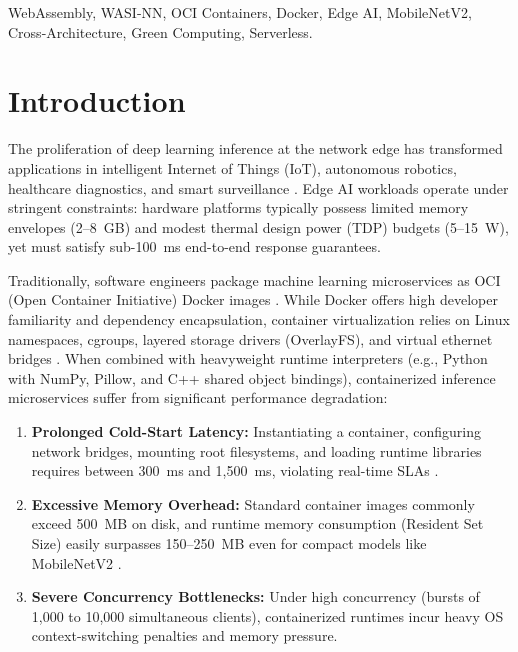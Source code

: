 \documentclass[conference]{IEEEtran}
\begin{document}
\begin{IEEEkeywords}
WebAssembly, WASI-NN, OCI Containers, Docker, Edge AI, MobileNetV2, Cross-Architecture, Green Computing, Serverless.
\end{IEEEkeywords}

\section{Introduction}
The proliferation of deep learning inference at the network edge has transformed applications in intelligent Internet of Things (IoT), autonomous robotics, healthcare diagnostics, and smart surveillance \cite{morabito2017evaluating}. Edge AI workloads operate under stringent constraints: hardware platforms typically possess limited memory envelopes (2--8~GB) and modest thermal design power (TDP) budgets (5--15~W), yet must satisfy sub-100~ms end-to-end response guarantees.

Traditionally, software engineers package machine learning microservices as OCI (Open Container Initiative) Docker images \cite{casalicchio2020container}. While Docker offers high developer familiarity and dependency encapsulation, container virtualization relies on Linux namespaces, cgroups, layered storage drivers (OverlayFS), and virtual ethernet bridges \cite{felter2015updated, sharma2016containers}. When combined with heavyweight runtime interpreters (e.g., Python with NumPy, Pillow, and C++ shared object bindings), containerized inference microservices suffer from significant performance degradation:
\begin{enumerate}
    \item \textbf{Prolonged Cold-Start Latency:} Instantiating a container, configuring network bridges, mounting root filesystems, and loading runtime libraries requires between 300~ms and 1,500~ms, violating real-time SLAs \cite{xuan2022measuring, wang2021cold}.
    \item \textbf{Excessive Memory Overhead:} Standard container images commonly exceed 500~MB on disk, and runtime memory consumption (Resident Set Size) easily surpasses 150--250~MB even for compact models like MobileNetV2 \cite{sandler2018mobilenetv2}.
    \item \textbf{Severe Concurrency Bottlenecks:} Under high concurrency (bursts of 1,000 to 10,000 simultaneous clients), containerized runtimes incur heavy OS context-switching penalties and memory pressure.
\end{enumerate}
\end{document}
